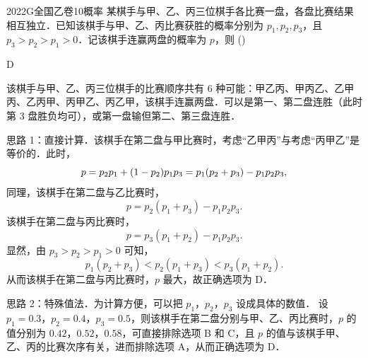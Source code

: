 
\begin{problem}{2022}{G}{全国乙卷}{10}{概率}
某棋手与甲、乙、丙三位棋手各比赛一盘，各盘比赛结果相互独立．已知该棋手与甲、乙、丙比赛获胜的概率分别为 $ p_1, p_2, p_3 $，且 $ p_3 > p_2 > p_1 > 0 $．记该棋手连赢两盘的概率为 $ p $，则 (\hspace{1cm})
\begin{choices}
\end{choices}
\end{problem}

\begin{answer}
D
\end{answer}

\begin{solutions}
该棋手与甲、乙、丙三位棋手的比赛顺序共有 6 种可能：甲乙丙、甲丙乙、乙甲丙、乙丙甲、丙甲乙、丙乙甲，该棋手连赢两盘．可以是第一、第二盘连胜（此时第 3 盘胜负均可），或第一盘输但第二、第三盘连胜．

思路 1：直接计算．该棋手在第二盘与甲比赛时，考虑“乙甲丙”与考虑“丙甲乙”是等价的．此时，
$$
p = p_2 p_1 + (1 - p_2) p_1 p_3 \\
= p_1 (p_2 + p_3) - p_1 p_2 p_3,
$$
同理，该棋手在第二盘与乙比赛时，
$$
p = p_2 (p_1 + p_3) - p_1 p_2 p_3.
$$
该棋手在第二盘与丙比赛时，
$$
p = p_3 (p_1 + p_2) - p_1 p_2 p_3.
$$
显然，由 $ p_3 > p_2 > p_1 > 0 $ 可知，
$$
p_1 (p_2 + p_3) < p_2 (p_1 + p_3) < p_3 (p_1 + p_2).
$$
从而该棋手在第二盘与丙比赛时，$ p $ 最大，故正确选项为 D．

思路 2：特殊值法．为计算方便，可以把 $ p_1 $，$ p_2 $，$ p_3 $ 设成具体的数值．  
设 $ p_1 = 0.3 $，$ p_2 = 0.4 $，$ p_3 = 0.5 $，则该棋手在第二盘分别与甲、乙、丙比赛时，$ p $ 的值分别为 $ 0.42 $，$ 0.52 $，$ 0.58 $，可直接排除选项 B 和 C，且 $ p $ 的值与该棋手甲、乙、丙的比赛次序有关，进而排除选项 A，从而正确选项为 D．
\end{solutions}